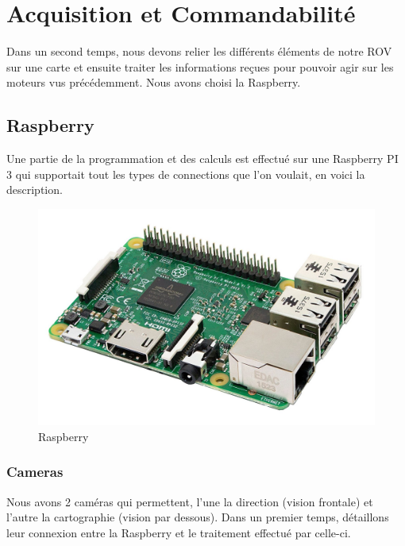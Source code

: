 \documentclass[a4paper,11pt]{report}
\begin{document}
				
\chapter{Acquisition et Commandabilité}
	
	Dans un second temps, nous devons relier les différents éléments de notre ROV sur une carte et ensuite traiter les informations reçues pour pouvoir agir sur les moteurs vus précédemment. Nous avons choisi la Raspberry.
	
	\section{Raspberry}
		Une partie de la programmation et des calculs est effectué sur une Raspberry PI 3 qui supportait tout les types de connections que l'on voulait, en voici la description.
			\begin{figure}[!h]
					\begin{center}
						\includegraphics[scale=0.2]{Photos/Raspberry.jpg}
						\caption{Raspberry}
					\end{center}
				\end{figure}
				
		\subsection{Cameras}
			Nous avons 2 caméras qui permettent, l'une la direction (vision frontale) et l'autre la cartographie (vision par dessous). Dans un premier temps, détaillons leur connexion entre la Raspberry et le traitement effectué par celle-ci.
			
\end{document}
